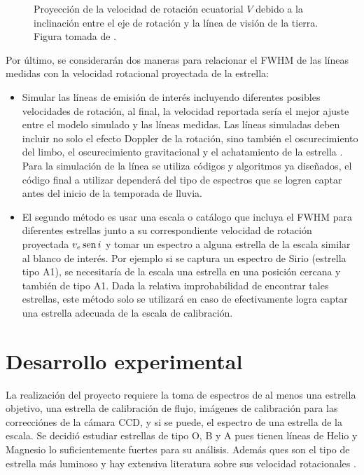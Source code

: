 \documentclass[notitlepage,letterpaper,12pt]{article} %
\def\sen{\mathop{\mbox{\normalfont sen}}\nolimits} %
\begin{document}
\begin{figure}[h!]
  \centering
  \caption{Proyección de la velocidad de rotación ecuatorial $V$ debido a la inclinación entre el eje de rotación y la línea de visión de la tierra. Figura tomada de \cite{book:590711}.}
  \label{proyeccion}
\end{figure}

Por último, se considerarán dos maneras para relacionar el FWHM de las líneas medidas con la velocidad rotacional proyectada de la estrella:
\begin{itemize}
\item Simular las líneas de emisión de interés incluyendo diferentes posibles velocidades de rotación, al final, la velocidad reportada sería el mejor ajuste entre el modelo simulado y las líneas medidas. Las líneas simuladas deben incluir no solo el efecto Doppler de la rotación, sino también el oscurecimiento del limbo, el oscurecimiento gravitacional y el achatamiento de la estrella \cite{Slettebak} \cite{syntetic}. Para la simulación de la línea se utiliza códigos y algoritmos ya diseñados\cite{Przybilla}, el código final a utilizar dependerá del tipo de espectros que se logren captar antes del inicio de la temporada de lluvia.
\item El segundo método es usar una escala o catálogo que incluya el FWHM para diferentes estrellas junto a su correspondiente velocidad de rotación proyectada $v_e \sen i$ y tomar un espectro a alguna estrella de la escala similar al blanco de interés. Por ejemplo si se captura un espectro de Sirio (estrella tipo A1), se necesitaría de la escala una estrella en una posición cercana y también de tipo A1. Dada la relativa improbabilidad de encontrar tales estrellas, este método solo se utilizará en caso de efectivamente logra captar una estrella adecuada de la escala de calibración\cite{Slettebak}.
\end{itemize} 

\section{Desarrollo experimental}
La realización del proyecto requiere la toma de espectros de al menos una estrella objetivo, una estrella de calibración de flujo, imágenes de calibración para las correcciónes de la cámara CCD, y si se puede, el espectro de una estrella de la escala. Se decidió estudiar estrellas de tipo O, B y A pues tienen líneas de Helio y Magnesio lo suficientemente fuertes para su análisis. Además ques son el tipo de estrella más luminoso y hay extensiva literatura sobre sus velocidad rotacionales \cite{syntetic} \cite{rotOfB} \cite{2004IAUS..224..109R}.
\end{document}
